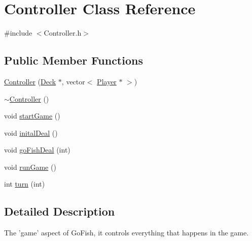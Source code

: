 \hypertarget{class_controller}{\section{Controller Class Reference}
\label{class_controller}
}


{\ttfamily \#include $<$Controller.\-h$>$}

\subsection*{Public Member Functions}
\begin{DoxyCompactItemize}
\item 
\hyperlink{class_controller_a8b7a23e164dc092ae540501ea698dd6e}{Controller} (\hyperlink{class_deck}{Deck} $\ast$, vector$<$ \hyperlink{class_player}{Player} $\ast$ $>$)
\item 
\hyperlink{class_controller_a0ab87934c4f7a266cfdb86e0f36bc1b5}{$\sim$\-Controller} ()
\item 
void \hyperlink{class_controller_a3a9e81ea10c63eea81c2612ba3beb5c4}{start\-Game} ()
\item 
void \hyperlink{class_controller_aa2a6716682fa463fc3d6bbdb510630e5}{inital\-Deal} ()
\item 
void \hyperlink{class_controller_aa93207ee72313ca40934a10bf36adca9}{go\-Fish\-Deal} (int)
\item 
void \hyperlink{class_controller_ad65603733541eb7698575f02de8f639d}{run\-Game} ()
\item 
int \hyperlink{class_controller_a9f08004e5e9c6462d188be01d07befe8}{turn} (int)
\end{DoxyCompactItemize}


\subsection{Detailed Description}
The 'game' aspect of Go\-Fish, it controls everything that happens in the game. 

